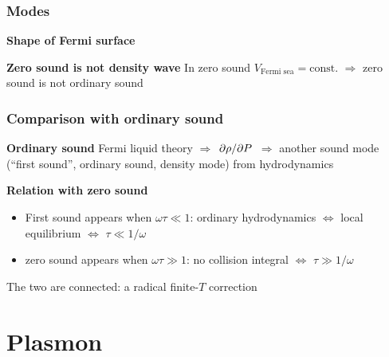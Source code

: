 \documentclass{beamer}
\begin{document}
\begin{frame}
\frametitle{Modes}

\textbf{Shape of Fermi surface}

\begin{center}
    
\end{center}

\textbf{Zero sound is not density wave} In zero sound $V_{\text{Fermi sea}} = \text{const}.$
$\Rightarrow$ zero sound is not ordinary sound

\end{frame}

\begin{frame}
\frametitle{Comparison with ordinary sound}

\textbf{Ordinary sound} Fermi liquid theory $\Rightarrow$ $\pdv*{\rho}{P}$ $\Rightarrow$
another sound mode (``first sound'', ordinary sound, density mode) from hydrodynamics

\vspace{0.5cm}

\textbf{Relation with zero sound} 
\begin{itemize}
    \item First sound appears when $\omega \tau \ll 1$:
    ordinary hydrodynamics $\Leftrightarrow$ local equilibrium $\Leftrightarrow$ $\tau \ll 1 / \omega$
    \item zero sound appears when $\omega \tau \gg 1$: 
    no collision integral $\Leftrightarrow$ $\tau \gg 1 / \omega$
\end{itemize}

The two are connected: a radical finite-$T$ correction

\begin{center}
    
\end{center}    

\end{frame}

\section{Plasmon}
\end{document}
